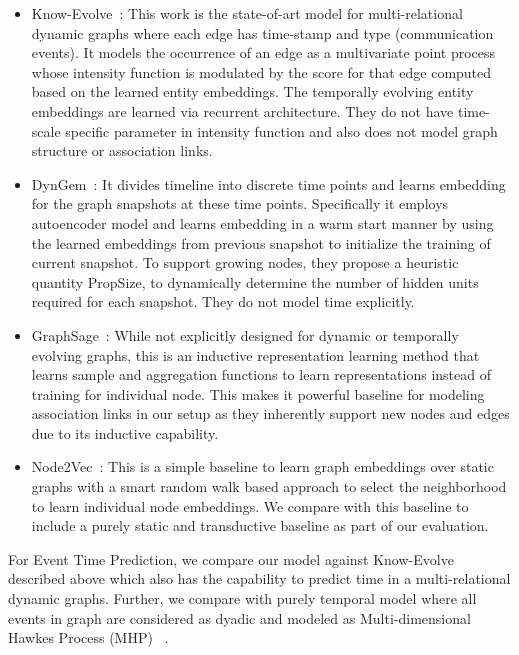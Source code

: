 \documentclass[11pt]{article}
\begin{document}
\begin{itemize}

\item Know-Evolve~\cite{TriDaiWanSon17}: This work is the state-of-art model for multi-relational dynamic graphs where each edge has time-stamp and type (communication events).  It models the occurrence of an edge as a multivariate point process whose intensity
function is modulated by the score for that
edge computed based on the learned entity embeddings. The temporally evolving entity embeddings are learned via recurrent architecture. They do not have time-scale specific parameter in intensity function and also does not model graph structure or association links. 
\item DynGem~\cite{GoyKamHeLiu17}: It divides timeline into discrete time points and learns embedding for the graph snapshots at these time points. Specifically it employs autoencoder model and learns embedding in a warm start manner by using the learned embeddings from previous snapshot to initialize the training of current snapshot. To support growing nodes, they propose a  heuristic quantity PropSize, to dynamically determine the number of hidden units required
for each snapshot. They do not model time explicitly.
\item GraphSage~\cite{HamYinLes17}: While not explicitly designed for dynamic or temporally evolving graphs, this is an inductive representation learning method that learns sample and aggregation functions to learn representations instead of training for individual node. This makes it powerful baseline for modeling association links in our setup as they inherently support new nodes and edges due to its inductive capability. 
\item Node2Vec~\cite{GroLes16}: This is a simple baseline to learn graph embeddings over static graphs with a smart random walk based approach to select the neighborhood to learn individual node embeddings. We compare with this baseline to include a purely static and transductive baseline as part of our evaluation.
\end{itemize}

For Event Time Prediction, we compare our model against Know-Evolve described above which also has the capability to predict time in a multi-relational dynamic graphs. Further, we compare with purely temporal model where all events in graph are considered as dyadic and modeled as Multi-dimensional Hawkes Process (MHP) ~\cite{DuWanHeetal15}. 
\end{document}

